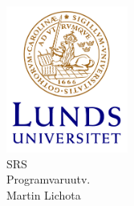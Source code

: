 \begin{titlepage}
\begin{center}
\includegraphics[width=0.30\textwidth]{./logo}~\\[1cm]
\textsc{\LARGE SRS}\\
\textup{Programvaruutv.}\\[1cm]
Martin Lichota\\


\end{center}
\end{titlepage}

